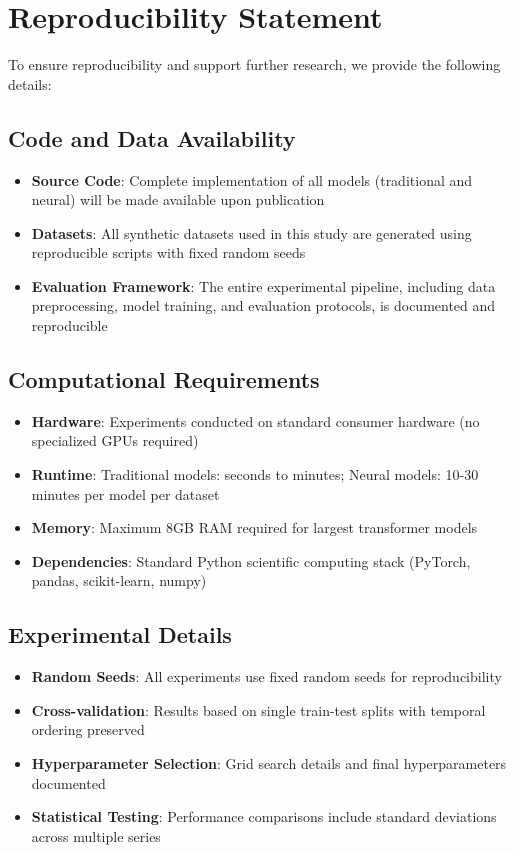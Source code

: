 \documentclass[11pt]{article}
\begin{document}
\section*{Reproducibility Statement}

To ensure reproducibility and support further research, we provide the following details:

\subsection*{Code and Data Availability}

\begin{itemize}
\item \textbf{Source Code}: Complete implementation of all models (traditional and neural) will be made available upon publication
\item \textbf{Datasets}: All synthetic datasets used in this study are generated using reproducible scripts with fixed random seeds
\item \textbf{Evaluation Framework}: The entire experimental pipeline, including data preprocessing, model training, and evaluation protocols, is documented and reproducible
\end{itemize}

\subsection*{Computational Requirements}

\begin{itemize}
\item \textbf{Hardware}: Experiments conducted on standard consumer hardware (no specialized GPUs required)
\item \textbf{Runtime}: Traditional models: seconds to minutes; Neural models: 10-30 minutes per model per dataset
\item \textbf{Memory}: Maximum 8GB RAM required for largest transformer models
\item \textbf{Dependencies}: Standard Python scientific computing stack (PyTorch, pandas, scikit-learn, numpy)
\end{itemize}

\subsection*{Experimental Details}

\begin{itemize}
\item \textbf{Random Seeds}: All experiments use fixed random seeds for reproducibility
\item \textbf{Cross-validation}: Results based on single train-test splits with temporal ordering preserved
\item \textbf{Hyperparameter Selection}: Grid search details and final hyperparameters documented
\item \textbf{Statistical Testing}: Performance comparisons include standard deviations across multiple series
\end{itemize}
\end{document}

